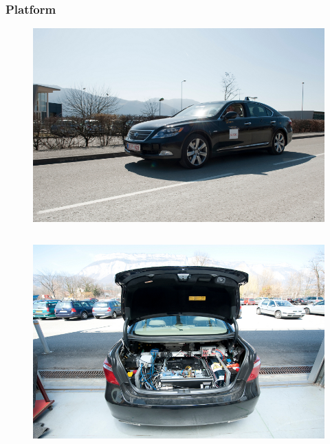 \documentclass{beamer}
\begin{document}
	\begin{frame}
		\frametitle{Platform}
		\begin{figure}[h]
			\center
			\includegraphics[scale=0.8]{../img/testbed:car}
		  \end{figure}		
		
		  \begin{columns}[t]
		  \begin{column}{5cm}
		  \begin{figure}[h]
			\center
			\includegraphics[scale=0.7]{../img/testbed:trunc}
		  \end{figure}
		  \end{column}
		  

\end{columns}
\end{frame}
\end{document}
